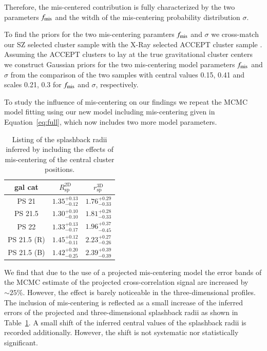 \documentclass[iop, apjl, twocolappendix, numberedappendix]{emulateapj}
\begin{document}
Therefore, the mis-centered contribution is fully characterized by the two parameters $f_{\rm mis}$ and the witdh 
of the mis-centering probability distribution $\sigma$.

To find the priors for the two mis-centering paramters $f_{\rm mis}$ and $\sigma$ we cross-match our SZ selected cluster sample with the X-Ray selected ACCEPT cluster sample \citep{cavagnolo2009vizier}.
Assuming the ACCEPT clusters to lay at the true gravitational cluster centers we construct Gaussian priors
for the two mis-centering model parameters $f_{\rm mis}$ and $\sigma$ from the comparison of the 
two samples with central values 0.15, 0.41 and scales 0.21, 0.3 for $f_{\rm mis}$ and $\sigma$, respectively.

To study the influence of mis-centering on our findings we repeat the MCMC model fitting using our new model including mis-centering given in Equation~\ref{eq:full}, which now includes two more model parameters. 

\begin{table}
    \centering
    \caption{Listing of the splashback radii inferred by including the effects of mis-centering of the central cluster positions. }
    \label{tab:mis_splash}
    \begin{tabular}{ccc}
    \hline 
gal cat &  $R_{\mathrm{sp}}^{\mathrm{2D}}$ & $r_{\mathrm{sp}}^{\mathrm{3D}}$ \\
\hline 
\hline 
PS 21 &$1.35_{-0.12}^{+0.13}$ & $1.76_{-0.33}^{+0.29}$\\
\hline
PS 21.5 & $1.30_{-0.10}^{+0.10}$&$1.81_{-0.33}^{+0.28}$\\
\hline
PS 22 &$1.33_{-0.17}^{+0.13}$ & $1.96_{-0.45}^{+0.37}$\\
\hline
PS 21.5 (R) & $1.45_{-0.11}^{+0.12}$ & $2.23_{-0.26}^{+0.27}$ \\
\hline
PS 21.5 (B) & $1.42_{-0.25}^{+0.20}$ & $2.39_{-0.39}^{+0.39}$ \\
\hline
    \end{tabular} 
\end{table}

We find that due to the use of a projected mis-centering model the error bands of the MCMC estimate of the projected cross-correlation signal are increased by $\sim 25$\%. However, the effect is barely noticeable in the three-dimensional profiles. 
The inclusion of mis-centering is reflected as a small increase of the inferred errors of the projected and three-dimensional splashback radii as shown in Table~\ref{tab:mis_splash}. A small shift of the inferred central values of the splashback radii is recorded additionally. However, the shift is not systematic nor statistically significant.
\end{document}
